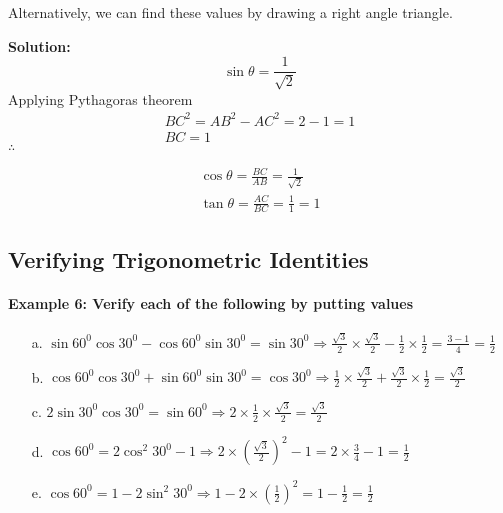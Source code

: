\documentclass{article}
\begin{document}
Alternatively, we can find these values by drawing a right angle triangle.

\begin{center}
\end{center}

{\scriptsize \textbf{Solution:}}
\[ \sin\theta = \frac{1}{\sqrt{2}} \]
Applying Pythagoras theorem
\[
  \begin{aligned}
    BC^{2} = AB^{2} - AC^{2} = 2 - 1 = 1 \\
    BC = 1
  \end{aligned}
\]
$\therefore$

\[
  \begin{aligned}
    \cos\theta = \frac{BC}{AB} = \frac{1}{\sqrt{2}} \\
    \tan\theta = \frac{AC}{BC} = \frac{1}{1} = 1
  \end{aligned}
\]

\subsection{Verifying Trigonometric Identities}
\paragraph{Example 6: Verify each of the following by putting values}

\begin{enumerate}
  \item[a.] $\sin 60^{0} \cos 30^{0} - \cos 60^{0} \sin 30^{0} = \sin 30^{0} \Rightarrow \frac{\sqrt{3}}{2} \times \frac{\sqrt{3}}{2} - \frac{1}{2} \times \frac{1}{2} = \frac{3-1}{4}=\frac{1}{2}$
  \item[b.] $\cos 60^{0} \cos 30^{0} + \sin 60^{0} \sin 30^{0} = \cos 30^{0} \Rightarrow \frac{1}{2} \times \frac{\sqrt{3}}{2} + \frac{\sqrt{3}}{2} \times \frac{1}{2} = \frac{\sqrt{3}}{2}$
  \item[c.] $2 \sin 30^{0} \cos 30^{0} = \sin 60^{0} \Rightarrow 2 \times \frac{1}{2} \times \frac{\sqrt{3}}{2} = \frac{\sqrt{3}}{2}$
  \item[d.] $\cos 60^{0} = 2 \cos^{2} 30^{0} - 1 \Rightarrow 2 \times \left(\frac{\sqrt{3}}{2}\right)^{2} - 1 = 2 \times \frac{3}{4} - 1 = \frac{1}{2}$
  \item[e.] $\cos 60^{0} = 1 - 2 \sin^{2} 30^{0} \Rightarrow 1 - 2 \times \left(\frac{1}{2}\right)^{2} = 1 - \frac{1}{2} = \frac{1}{2}$
\end{enumerate}
\end{document}
